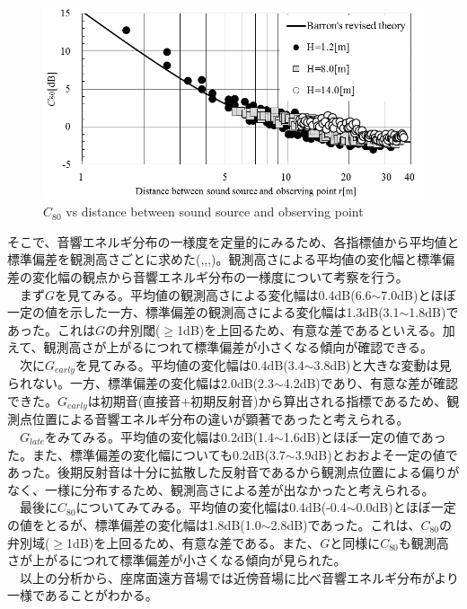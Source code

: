 \begin{figure}[H]
    \centering
    \includegraphics[keepaspectratio,scale=1]{04_att/C_Barron.png}
    \caption{\hspace{1mm}$C_{80}$ vs distance between sound source and observing point}
    \label{fig:C_Barron}
\end{figure}

そこで、音響エネルギ分布の一様度を定量的にみるため、各指標値から平均値と標準偏差を観測高さごとに求めた(,,,)。観測高さによる平均値の変化幅と標準偏差の変化幅の観点から音響エネルギ分布の一様度について考察を行う。
\\　まず$G$を見てみる。平均値の観測高さによる変化幅は0.4dB(6.6$\sim$7.0dB)とほぼ一定の値を示した一方、標準偏差の観測高さによる変化幅は1.3dB(3.1$\sim$1.8dB)であった。これは$G$の弁別閾($\geq$1dB)を上回るため、有意な差であるといえる。加えて、観測高さが上がるにつれて標準偏差が小さくなる傾向が確認できる。
\\　次に$G_{early}$を見てみる。平均値の変化幅は0.4dB(3.4$\sim$3.8dB)と大きな変動は見られない。一方、標準偏差の変化幅は2.0dB(2.3$\sim$4.2dB)であり、有意な差が確認できた。$G_{early}$は初期音(直接音+初期反射音)から算出される指標であるため、観測点位置による音響エネルギ分布の違いが顕著であったと考えられる。
\\　$G_{late}$をみてみる。平均値の変化幅は0.2dB(1.4$\sim$1.6dB)とほぼ一定の値であった。また、標準偏差の変化幅についても0.2dB(3.7$\sim$3.9dB)とおおよそ一定の値であった。後期反射音は十分に拡散した反射音であるから観測点位置による偏りがなく、一様に分布するため、観測高さによる差が出なかったと考えられる。
\\　最後に$C_{80}$についてみてみる。平均値の変化幅は0.4dB(-0.4$\sim$0.0dB)とほぼ一定の値をとるが、標準偏差の変化幅は1.8dB(1.0$\sim$2.8dB)であった。これは、$C_{80}$の弁別域($\geq$1dB)を上回るため、有意な差である。また、$G$と同様に$C_{80}$も観測高さが上がるにつれて標準偏差が小さくなる傾向が見られた。
\\　以上の分析から、座席面遠方音場では近傍音場に比べ音響エネルギ分布がより一様であることがわかる。

